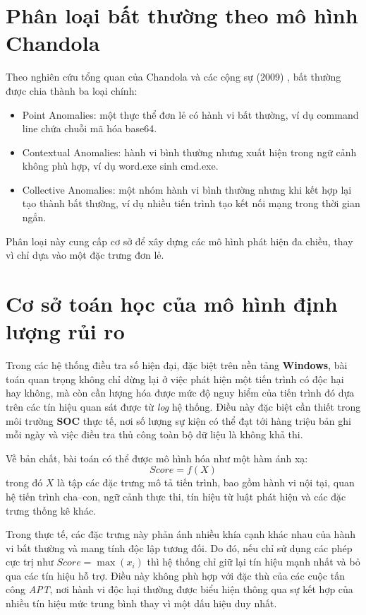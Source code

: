 \documentclass[../main.tex]{subfiles}
\begin{document}
\section{Phân loại bất thường theo mô hình Chandola}
\label{subsection:2.3}
Theo nghiên cứu tổng quan của Chandola và các cộng sự (2009) \cite{chandola2009anomaly}, bất thường được chia thành ba loại chính:

\begin{itemize}
    \item Point Anomalies: một thực thể đơn lẻ có hành vi bất thường, ví dụ command line chứa chuỗi mã hóa base64.
    \item Contextual Anomalies: hành vi bình thường nhưng xuất hiện trong ngữ cảnh không phù hợp, ví dụ word.exe sinh cmd.exe.
    \item Collective Anomalies: một nhóm hành vi bình thường nhưng khi kết hợp lại tạo thành bất thường, ví dụ nhiều tiến trình tạo kết nối mạng trong thời gian ngắn.
\end{itemize}

Phân loại này cung cấp cơ sở để xây dựng các mô hình phát hiện đa chiều, thay vì chỉ dựa vào một đặc trưng đơn lẻ.


\section{Cơ sở toán học của mô hình định lượng rủi ro}
\label{section:2.6}
Trong các hệ thống điều tra số hiện đại, đặc biệt trên nền tảng \textbf{Windows}, bài toán quan trọng không chỉ dừng lại ở việc phát hiện một tiến trình có độc hại hay không, mà còn cần lượng hóa được mức độ nguy hiểm của tiến trình đó dựa trên các tín hiệu quan sát được từ \textit{log} hệ thống. Điều này đặc biệt cần thiết trong môi trường \textbf{SOC} thực tế, nơi số lượng sự kiện có thể đạt tới hàng triệu bản ghi mỗi ngày và việc điều tra thủ công toàn bộ dữ liệu là không khả thi.

Về bản chất, bài toán có thể được mô hình hóa như một hàm ánh xạ:
\begin{equation}
    Score = f(X) \tag{1.2}
\end{equation}
trong đó $X$ là tập các đặc trưng mô tả tiến trình, bao gồm hành vi nội tại, quan hệ tiến trình cha–con, ngữ cảnh thực thi, tín hiệu từ luật phát hiện và các đặc trưng thống kê khác.

Trong thực tế, các đặc trưng này phản ánh nhiều khía cạnh khác nhau của hành vi bất thường và mang tính độc lập tương đối. Do đó, nếu chỉ sử dụng các phép cực trị như $Score = \max(x_i)$ thì hệ thống chỉ giữ lại tín hiệu mạnh nhất và bỏ qua các tín hiệu hỗ trợ. Điều này không phù hợp với đặc thù của các cuộc tấn công \textit{APT}, nơi hành vi độc hại thường được biểu hiện thông qua sự kết hợp của nhiều tín hiệu mức trung bình thay vì một dấu hiệu duy nhất.
\end{document}
